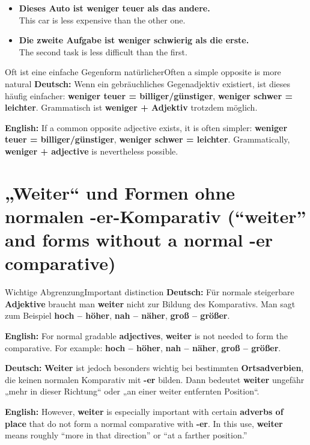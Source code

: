 \documentclass[a4paper,11pt]{article}
\newcommand{\GermanText}[1]{\textbf{Deutsch: }#1\par}
\newcommand{\EnglishText}[1]{{\small\color{SoftGray}\textbf{English: }#1\par}}
\newcommand{\ExampleItem}[2]{\item \textbf{#1}\\{\small\color{SoftGray}#2}}
\begin{document}
\begin{exbox}
\begin{itemize}
\ExampleItem{Dieses Auto ist weniger teuer als das andere.}{This car is less expensive than the other one.}
\ExampleItem{Die zweite Aufgabe ist weniger schwierig als die erste.}{The second task is less difficult than the first.}
\end{itemize}
\end{exbox}

\begin{grammarentry}{Oft ist eine einfache Gegenform natürlicher}{Often a simple opposite is more natural}
\GermanText{Wenn ein gebräuchliches Gegenadjektiv existiert, ist dieses häufig einfacher: \textbf{weniger teuer = billiger/günstiger}, \textbf{weniger schwer = leichter}. Grammatisch ist \textbf{weniger + Adjektiv} trotzdem möglich.}
\EnglishText{If a common opposite adjective exists, it is often simpler: \textbf{weniger teuer = billiger/günstiger}, \textbf{weniger schwer = leichter}. Grammatically, \textbf{weniger + adjective} is nevertheless possible.}
\end{grammarentry}

\section{„Weiter“ und Formen ohne normalen -er-Komparativ \textnormal{(“weiter” and forms without a normal -er comparative)}}

\begin{grammarentry}{Wichtige Abgrenzung}{Important distinction}
\GermanText{Für normale steigerbare \textbf{Adjektive} braucht man \textbf{weiter} nicht zur Bildung des Komparativs. Man sagt zum Beispiel \textbf{hoch -- höher}, \textbf{nah -- näher}, \textbf{groß -- größer}.}
\EnglishText{For normal gradable \textbf{adjectives}, \textbf{weiter} is not needed to form the comparative. For example: \textbf{hoch -- höher}, \textbf{nah -- näher}, \textbf{groß -- größer}.}

\GermanText{\textbf{Weiter} ist jedoch besonders wichtig bei bestimmten \textbf{Ortsadverbien}, die keinen normalen Komparativ mit \textbf{-er} bilden. Dann bedeutet \textbf{weiter} ungefähr „mehr in dieser Richtung“ oder „an einer weiter entfernten Position“.}
\EnglishText{However, \textbf{weiter} is especially important with certain \textbf{adverbs of place} that do not form a normal comparative with \textbf{-er}. In this use, \textbf{weiter} means roughly “more in that direction” or “at a farther position.”}
\end{grammarentry}
\end{document}
